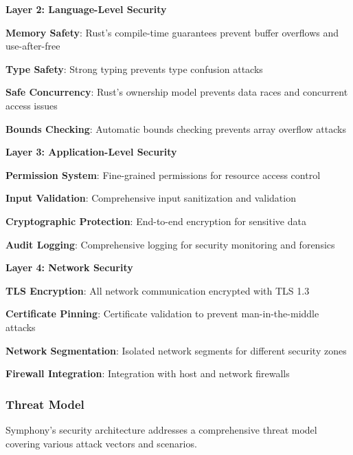 \textbf{Layer 2: Language-Level Security}
\begin{compactlist}
    \item \textbf{Memory Safety}: Rust's compile-time guarantees prevent buffer overflows and use-after-free
    \item \textbf{Type Safety}: Strong typing prevents type confusion attacks
    \item \textbf{Safe Concurrency}: Rust's ownership model prevents data races and concurrent access issues
    \item \textbf{Bounds Checking}: Automatic bounds checking prevents array overflow attacks
\end{compactlist}

\textbf{Layer 3: Application-Level Security}
\begin{compactlist}
    \item \textbf{Permission System}: Fine-grained permissions for resource access control
    \item \textbf{Input Validation}: Comprehensive input sanitization and validation
    \item \textbf{Cryptographic Protection}: End-to-end encryption for sensitive data
    \item \textbf{Audit Logging}: Comprehensive logging for security monitoring and forensics
\end{compactlist}

\textbf{Layer 4: Network Security}
\begin{compactlist}
    \item \textbf{TLS Encryption}: All network communication encrypted with TLS 1.3
    \item \textbf{Certificate Pinning}: Certificate validation to prevent man-in-the-middle attacks
    \item \textbf{Network Segmentation}: Isolated network segments for different security zones
    \item \textbf{Firewall Integration}: Integration with host and network firewalls
\end{compactlist}

\subsubsection*{Threat Model}

Symphony's security architecture addresses a comprehensive threat model covering various attack vectors and scenarios.

